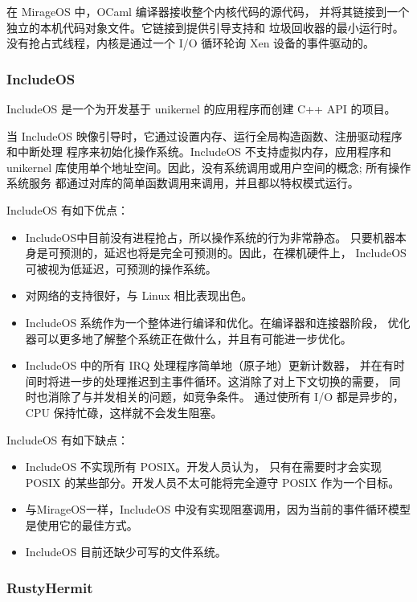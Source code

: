 \documentclass{../runikraft-report}
\begin{document}
在 MirageOS 中，OCaml 编译器接收整个内核代码的源代码，
并将其链接到一个独立的本机代码对象文件。它链接到提供引导支持和
垃圾回收器的最小运行时。没有抢占式线程，内核是通过一个 I/O 循环轮询
Xen 设备的事件驱动的。\cite{bib:11-unikerel2}

\subsubsection{IncludeOS}

IncludeOS 是一个为开发基于 unikernel 的应用程序而创建 C++ API 的项目。\cite{bib:9-includeos}

当 IncludeOS 映像引导时，它通过设置内存、运行全局构造函数、注册驱动程序和中断处理
程序来初始化操作系统。IncludeOS 不支持虚拟内存，应用程序和
 unikernel 库使用单个地址空间。因此，没有系统调用或用户空间的概念; 所有操作系统服务
 都通过对库的简单函数调用来调用，并且都以特权模式运行。\cite{bib:10-includeos2}

\noindent IncludeOS 有如下优点：\cite{bib:9-includeos}
\begin{itemize}
\item IncludeOS中目前没有进程抢占，所以操作系统的行为非常静态。
只要机器本身是可预测的，延迟也将是完全可预测的。因此，在裸机硬件上，
IncludeOS可被视为低延迟，可预测的操作系统。
\item 对网络的支持很好，与 Linux 相比表现出色。
\item IncludeOS 系统作为一个整体进行编译和优化。在编译器和连接器阶段，
优化器可以更多地了解整个系统正在做什么，并且有可能进一步优化。
\item IncludeOS 中的所有 IRQ 处理程序简单地（原子地）更新计数器，
并在有时间时将进一步的处理推迟到主事件循环。这消除了对上下文切换的需要，
同时也消除了与并发相关的问题，如竞争条件。
通过使所有 I/O 都是异步的，CPU 保持忙碌，这样就不会发生阻塞。
\end{itemize}

\noindent IncludeOS 有如下缺点：\cite{bib:9-includeos}
\begin{itemize}
\item IncludeOS 不实现所有 POSIX。开发人员认为，
只有在需要时才会实现 POSIX 的某些部分。开发人员不太可能将完全遵守 POSIX 作为一个目标。
\item 与MirageOS一样，IncludeOS 中没有实现阻塞调用，因为当前的事件循环模型是使用它的最佳方式。
\item IncludeOS 目前还缺少可写的文件系统。
\end{itemize}

\subsubsection{RustyHermit}
\end{document}
